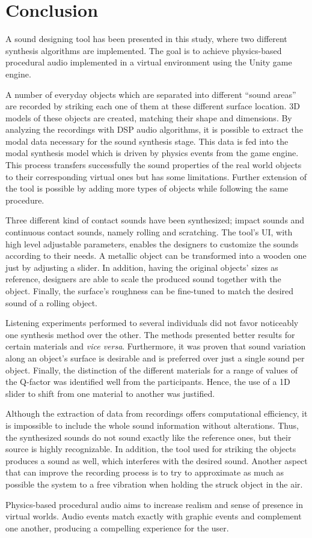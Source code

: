 \chapter{Conclusion}

A sound designing tool has been presented in this study, where two different synthesis algorithms are implemented. The goal is to achieve physics-based procedural audio implemented in a virtual environment using the Unity\textsuperscript{\textregistered} game engine. 

A number of everyday objects which are separated into different ``sound areas'' are recorded by striking each one of them at these different surface location. 3D models of these objects are created, matching their shape and dimensions. By analyzing the recordings with \gls{DSP} audio algorithms, it is possible to extract the modal data necessary for the sound synthesis stage. This data is fed into the modal synthesis model which is driven by physics events from the game engine. This process transfers successfully the sound properties of the real world objects to their corresponding virtual ones but has some limitations. Further extension of the tool is possible by adding more types of objects while following the same procedure.

Three different kind of contact sounds have been synthesized; impact sounds and continuous contact sounds, namely rolling and scratching. The tool's \gls{UI}, with high level adjustable parameters, enables the designers to customize the sounds according to their needs. A metallic object can be transformed into a wooden one just by adjusting a slider. In addition, having the original objects' sizes as reference, designers are able to scale the produced sound together with the object. Finally, the surface's roughness can be fine-tuned to match the desired sound of a rolling object.

Listening experiments performed to several individuals did not favor noticeably one synthesis method over the other. The methods presented better results for certain materials and \textit{vice versa}. Furthermore, it was proven that sound variation along an object's surface is desirable and is preferred over just a single sound per object. Finally, the distinction of the different materials for a range of values of the Q-factor was identified well from the participants. Hence, the use of a 1D slider to shift from one material to another was justified.

Although the extraction of data from recordings offers computational efficiency, it is impossible to include the whole sound information without alterations. Thus, the synthesized sounds do not sound exactly like the reference ones, but their source is highly recognizable. In addition, the tool used for striking the objects produces a sound as well, which interferes with the desired sound. Another aspect that can improve the recording process is to try to approximate as much as possible the system to a free vibration when holding the struck object in the air.

Physics-based procedural audio aims to increase realism and sense of presence in virtual worlds. Audio events match exactly with graphic events and complement one another, producing a compelling experience for the user.